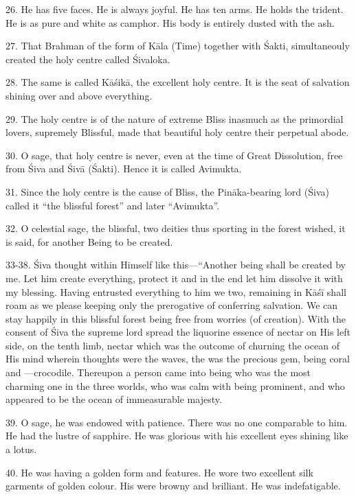 26. He has five faces. He is always joyful. He has ten arms. He holds
the trident. He is as pure and white as camphor. His body is entirely dusted
with the ash.

27. That Brahman of the form of Kāla (Time) together with Śakti, simultaneouly
created the holy centre called Śivaloka.

28. The same is called Kāśikā, the excellent holy centre. It is the seat of
salvation shining over and above everything.

29. The holy centre is of the nature of extreme Bliss inasmuch as the primordial
lovers, supremely Blissful, made that beautiful holy centre their perpetual
abode.

30. O sage, that holy centre is never, even at the time of Great Dissolution,
free from Śiva and Śivā (Śakti). Hence it is called Avimukta.

31. Since the holy centre is the cause of Bliss, the Pināka-bearing lord (Śiva)
called it “the blissful forest” and later “Avimukta”.

32. O celestial sage, the blissful, two deities thus sporting in the forest
wished, it is said, for another Being to be created.

33-38. Śiva thought within Himself like this—“Another being shall be created by
me. Let him create everything, protect it and in the end let him dissolve it
with my blessing. Having entrusted everything to him we two, remaining in Kāśī
shall roam as we please keeping only the prerogative of conferring salvation. We
can stay happily in this blissful forest being free from worries (of creation).
With the consent of Śiva the supreme lord spread the liquorine essence of nectar
on His left side, on the tenth limb, nectar which was the outcome of churning
the ocean of His mind wherein thoughts were the waves, the  was
the precious gem,  being coral and —crocodile. Thereupon
a person came into being who was the most charming one in the three worlds, who
was calm with  being prominent, and who appeared to be the ocean
of immeasurable majesty.

39. O sage, he was endowed with patience. There was no one comparable to him. He
had the lustre of sapphire. He was glorious with his excellent eyes shining like
a lotus.

40. He was having a golden form and features. He wore two excellent silk
garments of golden colour. His were browny and brilliant. He was indefatigable.

